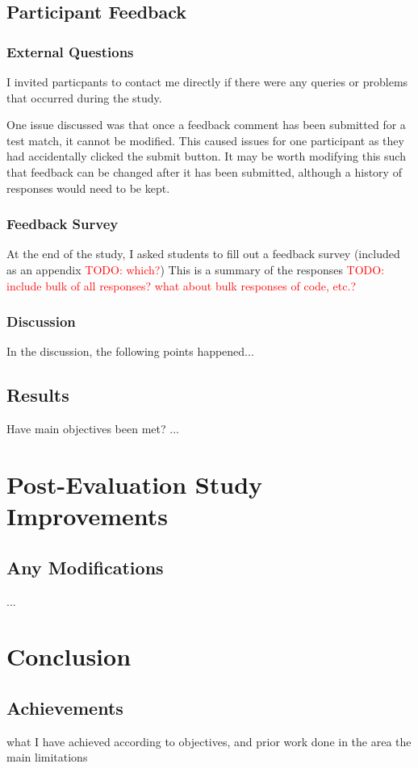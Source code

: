 \documentclass[a4paper,11pt]{report}
\newcommand{\todo}[1]{\textcolor{red}{TODO: #1}}
\begin{document}
\section{Participant Feedback}
\subsection{External Questions}
I invited particpants to contact me directly if there were any queries or problems that occurred during the study.\par
One issue discussed was that once a feedback comment has been submitted for a test match, it cannot be modified. This caused issues for one participant as they had accidentally clicked the submit button. It may be worth modifying this such that feedback can be changed after it has been submitted, although a history of responses would need to be kept.
\subsection{Feedback Survey}
At the end of the study, I asked students to fill out a feedback survey (included as an appendix \todo{which?})
This is a summary of the responses \todo{include bulk of all responses? what about bulk responses of code, etc.?}
\subsection{Discussion}
In the discussion, the following points happened...
\section{Results}
Have main objectives been met?
...

\chapter{Post-Evaluation Study Improvements}
\section{Any Modifications}
...


\chapter{Conclusion}
\section{Achievements}
what I have achieved according to objectives, and prior work done in the area
the main limitations
\end{document}
